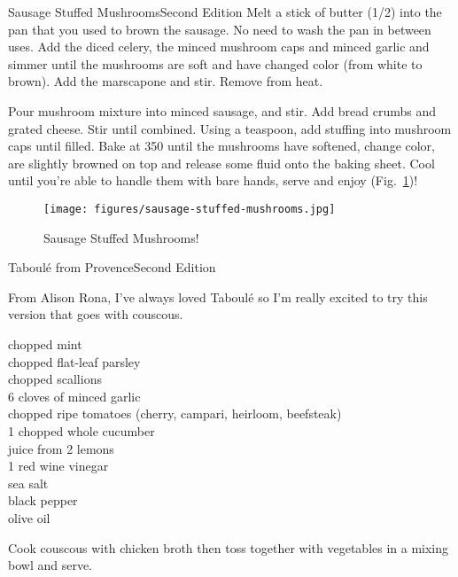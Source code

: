 \begin{entry}{Sausage Stuffed Mushrooms}{Second Edition}
Melt a stick of butter (\SI{1/2}{\cup}) into the pan that you used to brown the
sausage. No need to wash the pan in between uses. Add the diced celery, the
minced mushroom caps and minced garlic and simmer until the mushrooms are soft
and have changed color (from white to brown). Add the marscapone and stir.
Remove from heat.

Pour mushroom mixture into minced sausage, and stir. Add bread crumbs and grated
cheese. Stir until combined. Using a teaspoon, add stuffing into mushroom caps
until filled. Bake at \SI{350}{\degreeF} until the mushrooms have softened,
change color, are slightly browned on top and release some fluid onto the baking
sheet. Cool until you're able to handle them with bare hands, serve and enjoy (Fig.~\ref{fig:sausage-stuffed-mushrooms})!
\begin{figure}
    \centering
    \texttt{[image: figures/sausage-stuffed-mushrooms.jpg]}
    \caption{Sausage Stuffed Mushrooms!}
    \label{fig:sausage-stuffed-mushrooms}
\end{figure}
\end{entry}

\begin{entry}{Taboul\'{e} from Provence}{Second Edition}

\begin{open}
  From Alison Rona, I've always loved Taboul\'{e} so I'm really excited to try
  this version that goes with couscous.
\end{open}
\begin{ingredients}
    chopped mint\\
    chopped flat-leaf parsley\\
    chopped scallions\\
    6 cloves of minced garlic\\
    chopped ripe tomatoes (cherry, campari, heirloom, beefsteak)\\
    1 chopped whole cucumber\\
    juice from 2 lemons\\
    \SI{1}{\tblspoon} red wine vinegar\\
    sea salt\\
    black pepper\\
    olive oil
\end{ingredients}
Cook couscous with chicken broth then toss together with vegetables in a
mixing bowl and serve.
\end{entry}

